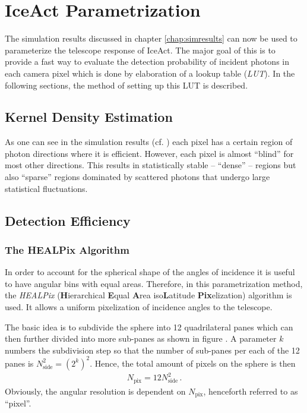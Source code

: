 \chapter{IceAct Parametrization}

The simulation results discussed in chapter \ref{chap:simresults} can now be used to parameterize the telescope response of IceAct. The major goal of this is to provide a fast way to evaluate the detection probability of incident photons in each camera pixel which is done by elaboration of a lookup table (\textit{LUT}). In the following sections, the method of setting up this LUT is described.

\section{Kernel Density Estimation}

As one can see in the simulation results (cf. ) each pixel has a certain region of photon directions where it is efficient. However, each pixel is almost \enquote{blind} for most other directions. This results in statistically stable -- \enquote{dense} -- regions but also \enquote{sparse} regions dominated by scattered photons that undergo large statistical fluctuations. 

\section{Detection Efficiency}

\subsection{The HEALPix Algorithm}

In order to account for the spherical shape of the angles of incidence it is useful to have angular bins with equal areas. Therefore, in this parametrization method, the \textit{HEALPix} (\textbf{H}ierarchical \textbf{E}qual \textbf{A}rea iso\textbf{L}atitude \textbf{Pix}elization) algorithm is used. It allows a uniform pixelization of incidence angles to the telescope.\\


The basic idea is to subdivide the sphere into 12 quadrilateral panes which can then further divided into more sub-panes as shown in figure . A parameter $k$ numbers the subdivision step so that the number of sub-panes per each of the 12 panes is $N_{\text{side}}^2=\left(2^k\right)^2$. Hence, the total amount of pixels on the sphere is then
\begin{align}
N_\text{pix} = 12N_\text{side}^2\,.
\end{align}
Obviously, the angular resolution is dependent on $N_\text{pix}$, henceforth referred to as \enquote{pixel}.

